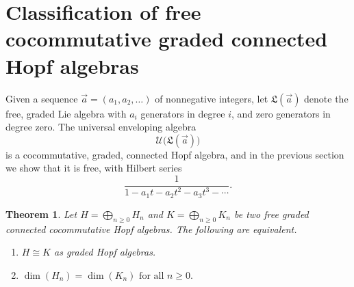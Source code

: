 \documentclass[11pt]{amsart}
\newtheorem{thm}{Theorem}
\theoremstyle{definition}
\numberwithin{equation}{section}
\begin{document}
%
 
\section{Classification of free cocommutative graded connected Hopf algebras} 

Given a sequence $\vec{a} = (a_{1}, a_{2}, \ldots)$ of nonnegative integers, let $\mathfrak{L}(\vec{a})$ denote the free, graded Lie algebra with $a_{i}$ generators in degree $i$, and zero generators in degree zero.  The universal enveloping algebra
\[
\mathcal{U}\big(\mathfrak{L}(\vec{a})\big)
\]
is a cocommutative, graded, connected Hopf algebra, and in the previous section we show that it is free, with Hilbert series
\[
\frac{1}{1 - a_{1}t - a_{2}t^{2} - a_{3}t^{3} - \cdots}.
\]

\begin{thm}\cite[Theorem 4.2]{AT22}
Let $H=\bigoplus_{n\geq 0} H_n$ and $K=\bigoplus_{n\geq 0} K_n$ be two free graded connected cocommutative Hopf algebras. The following are equivalent.
\begin{enumerate}
\item $H\cong K$ as graded Hopf algebras. 

\item $\dim(H_n)=\dim(K_n) \text{ for all } n\geq 0.$
\end{enumerate}   
\end{thm}
\end{document}

